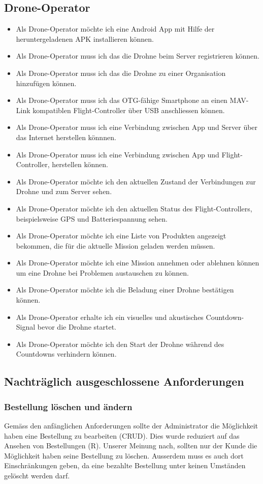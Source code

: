 \subsection{Drone-Operator}
\begin{itemize}
	\item Als Drone-Operator möchte ich eine Android App mit Hilfe der heruntergeladenen \Gls{APK} installieren können.
	\item Als Drone-Operator muss ich das die Drohne beim Server registrieren können.
	\item Als Drone-Operator muss ich das die Drohne zu einer Organisation hinzufügen können.
	\item Als Drone-Operator muss ich das \Gls{OTG}-fähige Smartphone an einen MAV-Link kompatiblen Flight-Controller über USB anschliessen können.
	\item Als Drone-Operator muss ich eine Verbindung zwischen App und Server über das Internet herstellen könnnen.
	\item Als Drone-Operator muss ich eine Verbindung zwischen App und \Gls{Flight-Controller}, herstellen können.
	\item Als Drone-Operator möchte ich den aktuellen Zustand der Verbindungen zur Drohne und zum Server sehen.
	\item Als Drone-Operator möchte ich den aktuellen Status des \Gls{Flight-Controller}s, beispielsweise GPS und Batteriespannung sehen.
	\item Als Drone-Operator möchte ich eine Liste von Produkten angezeigt bekommen, die für die aktuelle Mission geladen werden müssen.
	\item Als Drone-Operator möchte ich eine Mission annehmen oder ablehnen können um eine Drohne bei Problemen austauschen zu können.
	\item Als Drone-Operator möchte ich die Beladung einer Drohne bestätigen können.
	\item Als Drone-Operator erhalte ich ein visuelles und akustisches Countdown-Signal bevor die Drohne startet.
	\item Als Drone-Operator möchte ich den Start der Drohne während des Countdowns verhindern können.
\end{itemize}

\subsection{Nachträglich ausgeschlossene Anforderungen}

\subsubsection{Bestellung löschen und ändern}
Gemäss den anfänglichen Anforderungen sollte der Administrator die Möglichkeit haben eine Bestellung zu bearbeiten (CRUD). Dies wurde reduziert auf das Ansehen von Bestellungen (R). Unserer Meinung nach, sollten nur der Kunde die Möglichkeit haben seine Bestellung zu löschen. Ausserdem muss es auch dort Einschränkungen geben, da eine bezahlte Bestellung unter keinen Umständen gelöscht werden darf.

